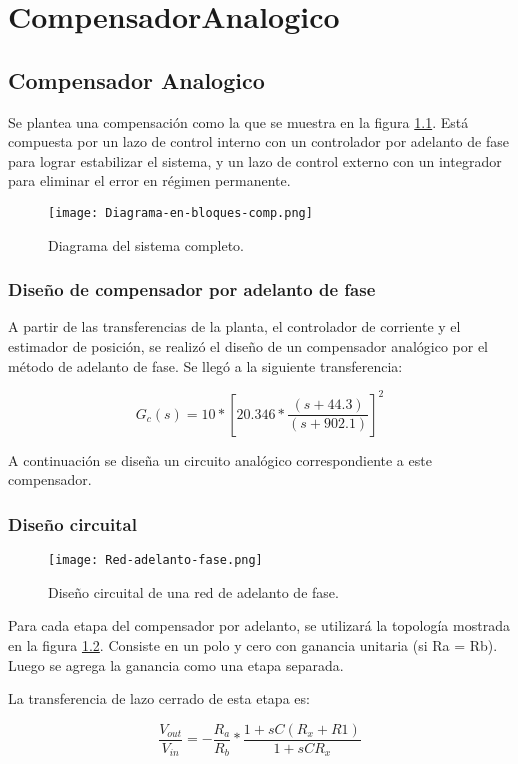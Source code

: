 \chapter{CompensadorAnalogico}  \label{cap:Compensador Analogico}

\section{Compensador Analogico}

\noindent Se plantea una compensación como la que se muestra en la figura \ref{fig:diag-en-bloques-comp}. Está compuesta por un lazo de control interno con un controlador por adelanto de fase para lograr estabilizar el sistema, y un lazo de control externo con un integrador para eliminar el error en régimen permanente.

\begin{figure}[H]
	\centering
	\texttt{[image: Diagrama-en-bloques-comp.png]}
	\caption{Diagrama del sistema completo.}
	\label{fig:diag-en-bloques-comp}
\end{figure}

\subsection{Diseño de compensador por adelanto de fase}

\noindent A partir de las transferencias de la planta, el controlador de corriente y el estimador de posición, se realizó el diseño de un compensador analógico por el método de adelanto de fase. Se llegó a la siguiente transferencia:


\begin{equation} 
	G_c(s) = 10*[20.346 * \frac{(s+44.3)}{(s+902.1)}]^2
\end{equation}

\noindent A continuación se diseña un circuito analógico correspondiente a este compensador.

\subsection{Diseño circuital}

\begin{figure}[H]
	\centering
	\texttt{[image: Red-adelanto-fase.png]}
	\caption{Diseño circuital de una red de adelanto de fase.}
	\label{fig:red-adelanto-fase}
\end{figure}


\noindent Para cada etapa del compensador por adelanto, se utilizará la topología mostrada en la figura \ref{fig:red-adelanto-fase}. Consiste en  un polo y cero con ganancia unitaria (si Ra = Rb). Luego se agrega la ganancia como una etapa separada.

\noindent La transferencia de lazo cerrado de esta etapa es:

\begin{equation} 
	\frac{V_{out}}{V_{in}}= - \frac{R_a}{R_b}*\frac{1+sC(R_x+R1)}{1+sCR_x}
\end{equation}

